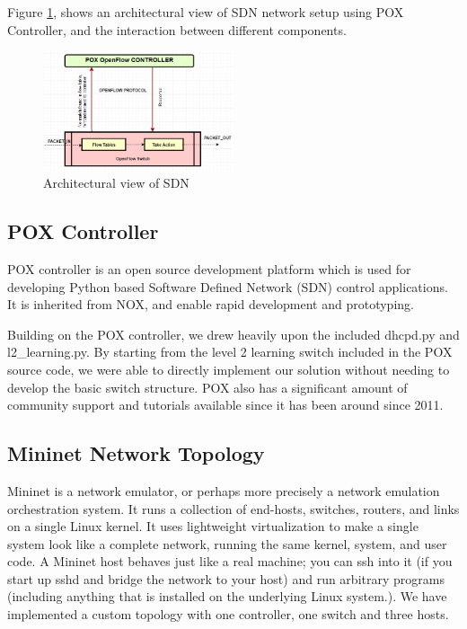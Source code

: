 \documentclass[conference]{IEEEtran}
\begin{document}
Figure \ref{fig:SDN}, shows an architectural view of SDN network setup using POX Controller, and the interaction between different components.

\begin{figure}[ht!]
\includegraphics[width=0.5\textwidth]{Figure_1.png}
\caption{Architectural view of SDN}
\label{fig:SDN}
\end{figure}


\subsection{POX Controller}
POX controller is an open source development platform which is used for developing Python based Software Defined Network (SDN) control applications. It is inherited from NOX, and enable rapid development and prototyping\cite{b8}.

Building on the POX controller, we drew heavily upon the included dhcpd.py and l2\_learning.py. By starting from the level 2 learning switch included in the POX source code, we were able to directly implement our solution without needing to develop the basic switch structure\cite{b9}. POX also has a significant amount of community support and tutorials available since it has been around since 2011\cite{b3}.


\subsection{Mininet Network Topology}
Mininet is a network emulator, or perhaps more precisely a network emulation orchestration system\cite{b2}. It runs a collection of end-hosts, switches, routers, and links on a single Linux kernel. It uses lightweight virtualization to make a single system look like a complete network, running the same kernel, system, and user code. A Mininet host behaves just like a real machine; you can ssh into it (if you start up sshd and bridge the network to your host) and run arbitrary programs (including anything that is installed on the underlying Linux system.). We have implemented a custom topology with one controller, one switch and three hosts.
\end{document}
